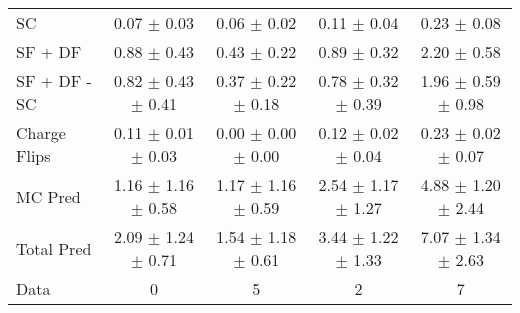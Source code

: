 \begin{tabular}{l|cccc}
                                 SC &  0.07 $\pm$  0.03 &  0.06 $\pm$  0.02 &  0.11 $\pm$  0.04 &  0.23 $\pm$  0.08 \\
                            SF + DF &  0.88 $\pm$  0.43 &  0.43 $\pm$  0.22 &  0.89 $\pm$  0.32 &  2.20 $\pm$  0.58 \\
\hline
                       SF + DF - SC &  0.82 $\pm$  0.43 $\pm$  0.41 &  0.37 $\pm$  0.22 $\pm$  0.18 &  0.78 $\pm$  0.32 $\pm$  0.39 &  1.96 $\pm$  0.59 $\pm$  0.98 \\
\hline\hline
                       Charge Flips &  0.11 $\pm$  0.01 $\pm$  0.03 &  0.00 $\pm$  0.00 $\pm$  0.00 &  0.12 $\pm$  0.02 $\pm$  0.04 &  0.23 $\pm$  0.02 $\pm$  0.07 \\
\hline
                            MC Pred &  1.16 $\pm$  1.16 $\pm$  0.58 &  1.17 $\pm$  1.16 $\pm$  0.59 &  2.54 $\pm$  1.17 $\pm$  1.27 &  4.88 $\pm$  1.20 $\pm$  2.44 \\
\hline
                         Total Pred &  2.09 $\pm$  1.24 $\pm$  0.71 &  1.54 $\pm$  1.18 $\pm$  0.61 &  3.44 $\pm$  1.22 $\pm$  1.33 &  7.07 $\pm$  1.34 $\pm$  2.63 \\
\hline\hline
                               Data &     0 &     5 &     2 &     7 \\
\hline\hline
\end{tabular}

